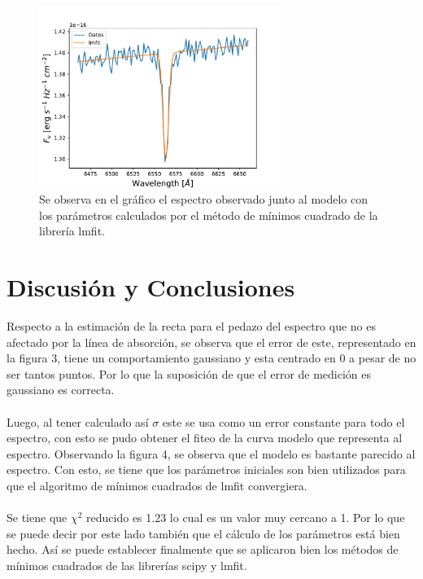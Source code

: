 \documentclass[letterpaper,oneside]{article}
\begin{document}
\begin{figure}
    \centering    
    \includegraphics[width=0.7\textwidth]{Tarea 6/Grafico fiteo espectro.pdf}
    \caption{Se observa en el gráfico el espectro observado junto al modelo con los parámetros calculados por el método de mínimos cuadrado de la librería lmfit.}
    \label{fiteo}
\end{figure}{}

\newpage
\section{Discusión y Conclusiones}
Respecto a la estimación de la recta para el pedazo del espectro que no es afectado por la línea de absorción, se observa que el error de este, representado en la figura 3, tiene un comportamiento gaussiano y esta centrado en 0 a pesar de no ser tantos puntos. Por lo que la suposición de que el error de medición es gaussiano es correcta.
\\ \\
Luego, al tener calculado así $\sigma$ este se usa como un error constante para todo el espectro, con esto se pudo obtener el fiteo de la curva modelo que representa al espectro. Observando la figura 4, se observa que el modelo es bastante parecido al espectro. Con esto, se tiene que los parámetros iniciales son bien utilizados para que el algoritmo de mínimos cuadrados de lmfit convergiera. 
\\ \\
Se tiene que $\chi^2$ reducido es 1.23 lo cual es un valor muy cercano a 1. Por lo que se puede decir por este lado también que el cálculo de los parámetros está bien hecho. Así se puede establecer finalmente que se aplicaron bien los métodos de mínimos cuadrados de las librerías scipy y lmfit.



\end{document}
